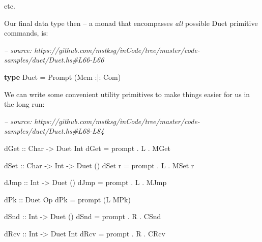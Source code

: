 \documentclass[]{article}
\newenvironment{Shaded}{}{}
\newcommand{\CommentTok}[1]{\textcolor[rgb]{0.38,0.63,0.69}{\textit{#1}}}
\newcommand{\DataTypeTok}[1]{\textcolor[rgb]{0.56,0.13,0.00}{#1}}
\newcommand{\FunctionTok}[1]{\textcolor[rgb]{0.02,0.16,0.49}{#1}}
\newcommand{\KeywordTok}[1]{\textcolor[rgb]{0.00,0.44,0.13}{\textbf{#1}}}
\newcommand{\NormalTok}[1]{#1}
\newcommand{\OtherTok}[1]{\textcolor[rgb]{0.00,0.44,0.13}{#1}}
\begin{document}
etc.

Our final data type then -- a monad that encompasses \emph{all} possible Duet
primitive commands, is:

\begin{Shaded}
\begin{Highlighting}[]
\CommentTok{-- source: https://github.com/mstksg/inCode/tree/master/code-samples/duet/Duet.hs#L66-L66}

\KeywordTok{type} \DataTypeTok{Duet} \FunctionTok{=} \DataTypeTok{Prompt}\NormalTok{ (}\DataTypeTok{Mem} \FunctionTok{:|:} \DataTypeTok{Com}\NormalTok{)}
\end{Highlighting}
\end{Shaded}

We can write some convenient utility primitives to make things easier for us in
the long run:

\begin{Shaded}
\begin{Highlighting}[]
\CommentTok{-- source: https://github.com/mstksg/inCode/tree/master/code-samples/duet/Duet.hs#L68-L84}

\OtherTok{dGet ::} \DataTypeTok{Char} \OtherTok{->} \DataTypeTok{Duet} \DataTypeTok{Int}
\NormalTok{dGet }\FunctionTok{=}\NormalTok{ prompt }\FunctionTok{.} \DataTypeTok{L} \FunctionTok{.} \DataTypeTok{MGet}

\OtherTok{dSet ::} \DataTypeTok{Char} \OtherTok{->} \DataTypeTok{Int} \OtherTok{->} \DataTypeTok{Duet}\NormalTok{ ()}
\NormalTok{dSet r }\FunctionTok{=}\NormalTok{ prompt }\FunctionTok{.} \DataTypeTok{L} \FunctionTok{.} \DataTypeTok{MSet}\NormalTok{ r}

\OtherTok{dJmp ::} \DataTypeTok{Int} \OtherTok{->} \DataTypeTok{Duet}\NormalTok{ ()}
\NormalTok{dJmp }\FunctionTok{=}\NormalTok{ prompt }\FunctionTok{.} \DataTypeTok{L} \FunctionTok{.} \DataTypeTok{MJmp}

\OtherTok{dPk ::} \DataTypeTok{Duet} \DataTypeTok{Op}
\NormalTok{dPk }\FunctionTok{=}\NormalTok{ prompt (}\DataTypeTok{L} \DataTypeTok{MPk}\NormalTok{)}

\OtherTok{dSnd ::} \DataTypeTok{Int} \OtherTok{->} \DataTypeTok{Duet}\NormalTok{ ()}
\NormalTok{dSnd }\FunctionTok{=}\NormalTok{ prompt }\FunctionTok{.} \DataTypeTok{R} \FunctionTok{.} \DataTypeTok{CSnd}

\OtherTok{dRcv ::} \DataTypeTok{Int} \OtherTok{->} \DataTypeTok{Duet} \DataTypeTok{Int}
\NormalTok{dRcv }\FunctionTok{=}\NormalTok{ prompt }\FunctionTok{.} \DataTypeTok{R} \FunctionTok{.} \DataTypeTok{CRcv}
\end{Highlighting}
\end{Shaded}
\end{document}
